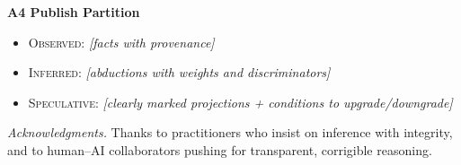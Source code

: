 \documentclass[11pt]{article}
\newcommand{\Obs}{\textsc{Observed}}
\newcommand{\Inf}{\textsc{Inferred}}
\newcommand{\Spec}{\textsc{Speculative}}
\begin{document}
\vspace{0.75em}
\noindent\textbf{A4 Publish Partition}\\
\begin{itemize}
  \item \Obs: \emph{[facts with provenance]}
  \item \Inf: \emph{[abductions with weights and discriminators]}
  \item \Spec: \emph{[clearly marked projections + conditions to upgrade/downgrade]}
\end{itemize}

\bigskip
\noindent\emph{Acknowledgments.} Thanks to practitioners who insist on inference with integrity, and to human--AI collaborators pushing for transparent, corrigible reasoning.
\end{document}
